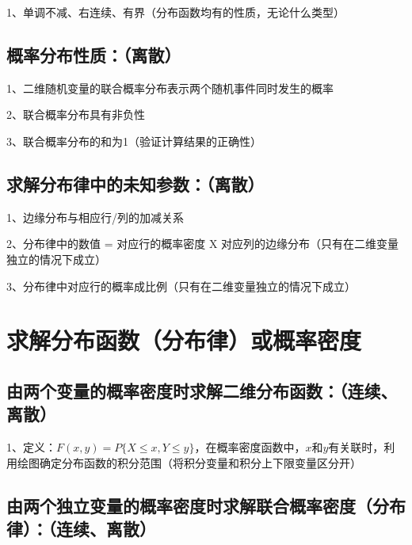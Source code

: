 1、单调不减、右连续、有界（分布函数均有的性质，无论什么类型）



\subsection{概率分布性质：（离散）}

1、二维随机变量的联合概率分布表示两个随机事件同时发生的概率

2、联合概率分布具有非负性

3、联合概率分布的和为1（验证计算结果的正确性）



\subsection{求解分布律中的未知参数：（离散）}

1、边缘分布与相应行/列的加减关系

2、分布律中的数值 = 对应行的概率密度 X 对应列的边缘分布（只有在二维变量独立的情况下成立）

3、分布律中对应行的概率成比例（只有在二维变量独立的情况下成立）

\section{求解分布函数（分布律）或概率密度}



\subsection{由两个变量的概率密度时求解二维分布函数：（连续、离散）}

1、定义：$F(x,y)=P\{ X \le x, Y \le y \}$，在概率密度函数中，$x$和$y$有关联时，利用绘图确定分布函数的积分范围（将积分变量和积分上下限变量区分开）



\subsection{由两个独立变量的概率密度时求解联合概率密度（分布律）：（连续、离散）}

